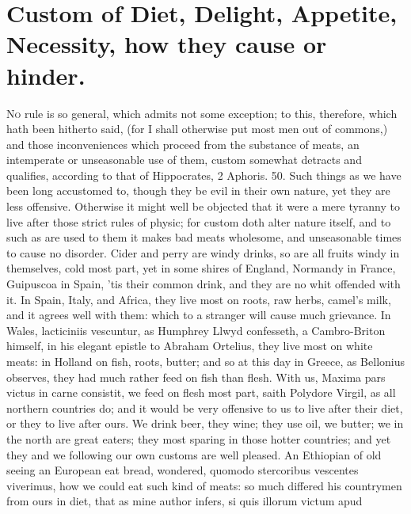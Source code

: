 {%
\section{Custom of Diet, Delight, Appetite, Necessity, how they cause or hinder.}

\lettrine{N}{o} rule is so general, which admits not some exception; to this,
therefore, which hath been hitherto said, (for I shall otherwise put
most men out of commons,) and those inconveniences which proceed from
the substance of meats, an intemperate or unseasonable use of them,
custom somewhat detracts and qualifies, according to that of
Hippocrates, 2 Aphoris. 50.  Such things as we have been long
accustomed to, though they be evil in their own nature, yet they are
less offensive. Otherwise it might well be objected that it were a mere
tyranny to live after those strict rules of physic; for custom
doth alter nature itself, and to such as are used to them it
makes bad meats wholesome, and unseasonable times to cause no disorder.
Cider and perry are windy drinks, so are all fruits windy in
themselves, cold most part, yet in some shires of England,
Normandy in France, Guipuscoa in Spain, 'tis their common drink, and
they are no whit offended with it. In Spain, Italy, and Africa, they
live most on roots, raw herbs, camel's milk, and it agrees well
with them: which to a stranger will cause much grievance. In Wales,
lacticiniis vescuntur, as Humphrey Llwyd confesseth, a Cambro-Briton
himself, in his elegant epistle to Abraham Ortelius, they live most on
white meats: in Holland on fish, roots, butter; and so at this
day in Greece, as Bellonius observes, they had much rather feed
on fish than flesh. With us, Maxima pars victus in carne consistit, we
feed on flesh most part, saith Polydore Virgil, as all northern
countries do; and it would be very offensive to us to live after their
diet, or they to live after ours. We drink beer, they wine; they use
oil, we butter; we in the north are great eaters; they most
sparing in those hotter countries; and yet they and we following our
own customs are well pleased. An Ethiopian of old seeing an European
eat bread, wondered, quomodo stercoribus vescentes viverimus, how we
could eat such kind of meats: so much differed his countrymen from ours
in diet, that as mine author infers, si quis illorum victum apud
}
